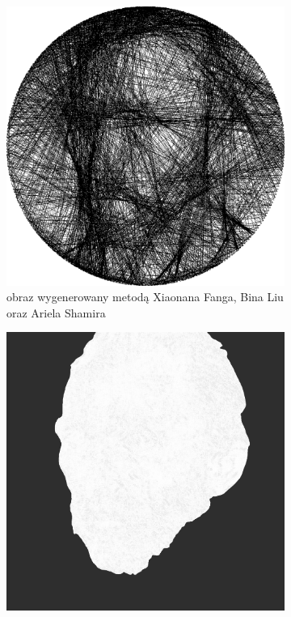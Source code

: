 \begin{figure}[H]
\begin{subfigure}{0.24\textwidth}
            \includegraphics[width = \textwidth]{img/6-comp/gogh_xiaonan_.png}
            \caption{obraz wygenerowany metodą Xiaonana Fanga, Bina Liu oraz Ariela Shamira}
            \label{comp-comp-dufu-gogh-f}
        \end{subfigure}
        \begin{subfigure}{0.24\textwidth}
            \centering
            \includegraphics[width = \textwidth]{img/6-comp/gogh_mask_c20_inv0_bg10_obj1_ed1.png}

\end{subfigure}
\end{figure}
